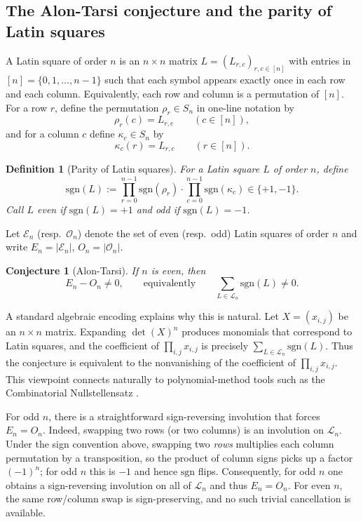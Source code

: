\documentclass[11pt]{amsart}
\newtheorem{conjecture}{Conjecture}
\newtheorem{definition}{Definition}
\newcommand{\sgn}{\mathrm{sgn}}
\newcommand{\Ln}{\mathcal{L}_n}
\newcommand{\E}{\mathcal{E}}
\newcommand{\Oset}{\mathcal{O}}
\begin{document}
\subsection{The Alon-Tarsi conjecture and the parity of Latin squares}
\label{sec:intro-alon}
A Latin square of order $n$ is an $n\times n$ matrix $L=(L_{r,c})_{r,c\in[n]}$ with entries in $[n]=\{0,1,\dots,n-1\}$
such that each symbol appears exactly once in each row and each column. Equivalently, each row and column is a permutation of $[n]$.
For a row $r$, define the permutation $\rho_r\in S_n$ in one-line notation by
\[
\rho_r(c)=L_{r,c}\qquad(c\in[n]),
\]
and for a column $c$ define $\kappa_c\in S_n$ by
\[
\kappa_c(r)=L_{r,c}\qquad(r\in[n]).
\]
\begin{definition}[Parity of Latin squares]
For a Latin square $L$ of order $n$, define
\[
\sgn(L):=\prod_{r=0}^{n-1}\sgn(\rho_r)\cdot \prod_{c=0}^{n-1}\sgn(\kappa_c)\in\{+1,-1\}.
\]
Call $L$ even if $\sgn(L)=+1$ and odd if $\sgn(L)=-1$.
\end{definition}

Let $\E_n$ (resp.\ $\Oset_n$) denote the set of even (resp.\ odd) Latin squares of order $n$ and write
$E_n=\lvert\E_n\rvert$, $O_n=\lvert\Oset_n\rvert$.

\begin{conjecture}[Alon-Tarsi]
If $n$ is even, then
\[
E_n-O_n\neq 0,
\qquad\text{equivalently}\qquad
\sum_{L\in\Ln}\sgn(L)\neq 0.
\]
\end{conjecture}

A standard algebraic encoding explains why this is natural. Let $X=(x_{i,j})$ be an $n\times n$ matrix.
Expanding $\det(X)^n$ produces monomials that correspond to Latin squares, and the coefficient of
$\prod_{i,j}x_{i,j}$ is precisely $\sum_{L\in\Ln}\sgn(L)$. Thus the conjecture is equivalent to the nonvanishing of the coefficient of $\prod_{i,j}x_{i,j}$. This viewpoint connects naturally to polynomial-method tools such as the Combinatorial Nullstellensatz \cite{Alon1999}.

For odd $n$, there is a straightforward sign-reversing involution that forces $E_n=O_n$.
Indeed, swapping two rows (or two columns) is an involution on $\Ln$.
Under the sign convention above, swapping two \emph{rows} multiplies each column permutation by a transposition, so the product of column signs picks up a factor $(-1)^n$; for odd $n$ this is $-1$ and hence $\sgn$ flips. Consequently, for odd $n$ one obtains a sign-reversing involution on all of $\Ln$ and thus $E_n=O_n$.
For even $n$, the same row/column swap is sign-preserving, and no such trivial cancellation is available.
\end{document}
